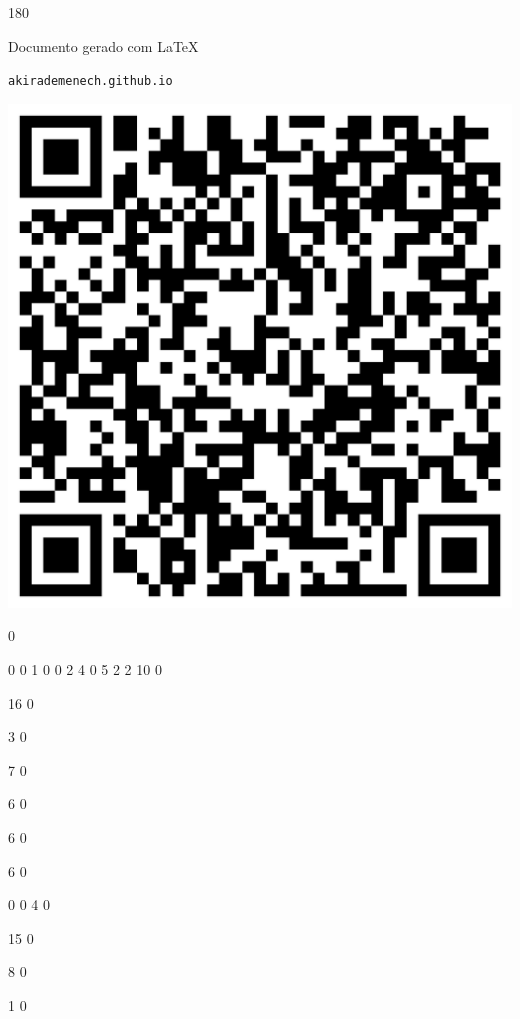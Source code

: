 \documentclass[12pt]{article}
\begin{document}
	\begin{turn}{180}	
		\begin{minipage}{\textwidth}		  
		  Documento gerado com \LaTeX			
		  
		  \texttt{akirademenech.github.io}

		  \includegraphics[height=0.3\textheight]{2e-2.pdf}

		\end{minipage}	
	\end{turn}  
		  
		\vfill  
		  
{
	0	%

	0	%
	0	%
	1	%
	0	%
	0	%
	2	%
	4	%
	0	%
	5	%
	2	%
	2	%
	10	%
	0	%

	16	%
	0	%

	3	%
	0	%

	7	%
	0	%

	6	%
	0	%

	6	%
	0	%

	6	%
	0	%

	0	%
	0	%
	4	%
	0	%

	15	%
	0	%

	8	%
	0	%

	1	%
	0	%

}	  
		    	
\end{document}

